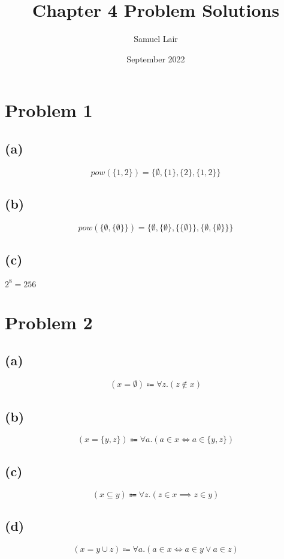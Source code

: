 \documentclass{article}
\title{Chapter 4 Problem Solutions}
\author{Samuel Lair}
\date{September 2022}
\begin{document}
\maketitle
\tableofcontents

\pagebreak

\section{Problem 1}

\subsection{(a)}
\[
	pow(\{1, 2\}) = \{\emptyset, \{1\}, \{2\}, \{1, 2\}\}
\]

\subsection{(b)}
\[
	pow(
	\{\emptyset, \{\emptyset\}\}) = \{\emptyset, \{\emptyset\}, \{\{\emptyset\}\}, \{\emptyset, \{\emptyset\}\}\}
\]

\subsection{(c)}
$2^8 = 256$

\pagebreak

\section{Problem 2}

\subsection{(a)}
\[
	(x = \emptyset) \Coloneqq \forall z.(z \notin x)
\]

\subsection{(b)}
\[
	(x = \{y, z\}) \Coloneqq \forall a.(a \in x \iff a \in \{y, z\})
\]

\subsection{(c)}
\[
	(x \subseteq y) \Coloneqq \forall z.(z \in x \implies z \in y)
\]


\subsection{(d)}
\[
	(x = y \cup z) \Coloneqq \forall a.(a \in x \iff a \in y \lor a \in z)
\]
\end{document}
